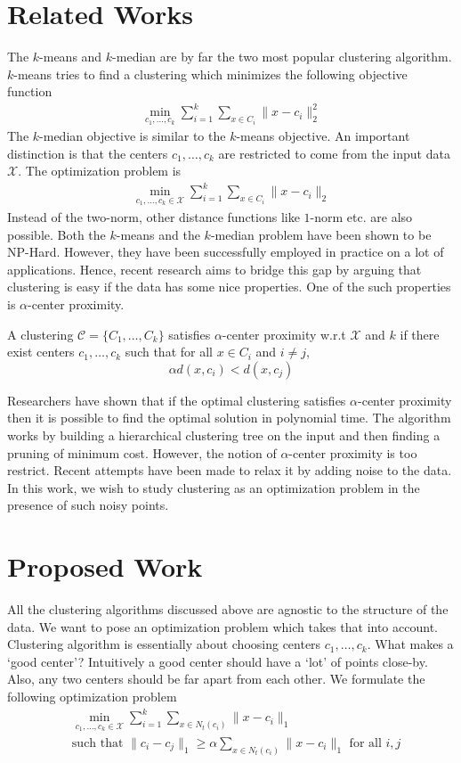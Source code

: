 \documentclass{article}
\newcommand{\mc}{\mathcal}
\begin{document}
\section{Related Works}
The $k$-means and $k$-median are by far the two most popular clustering algorithm. $k$-means tries to find a clustering which minimizes the following objective function
\begin{align*}
	\min_{c_1, \ldots, c_k} \sum_{i=1}^k \sum_{x \in C_i} \|x-c_i\|_2^2 
\end{align*}
The $k$-median objective is similar to the $k$-means objective. An important distinction is that the centers $c_1, \ldots, c_k$ are restricted to come from the input data $\mc X$. The optimization problem is
\begin{align*}
	\min_{c_1, \ldots, c_k \in \mc X} \sum_{i=1}^k \sum_{x \in C_i} \|x-c_i\|_2 
\end{align*}
Instead of the two-norm, other distance functions like $1$-norm etc. are also possible. Both the $k$-means and the $k$-median problem have been shown to be NP-Hard. However, they have been successfully employed in practice on a lot of applications. Hence, recent research aims to bridge this gap by arguing that clustering is easy if the data has some nice properties. One of the such properties is $\alpha$-center proximity. 

A clustering $\mc C = \{C_1, \ldots, C_k\}$ satisfies $\alpha$-center proximity w.r.t $\mc X$ and $k$ if there exist centers $c_1, \ldots, c_k$  such that for all $x \in C_i$ and $i\neq j$, $$\alpha d(x, c_i) < d(x, c_j)$$

Researchers have shown that if the optimal clustering satisfies $\alpha$-center proximity then it is possible to find the optimal solution in polynomial time. The algorithm works by building a hierarchical clustering tree on the input and then finding a pruning of minimum cost. However, the notion of $\alpha$-center proximity is too restrict. Recent attempts have been made to relax it by adding noise to the data. In this work, we wish to study clustering as an optimization problem in the presence of such noisy points.  

\section{Proposed Work}
All the clustering algorithms discussed above are agnostic to the structure of the data. We want to pose an optimization problem which takes that into account. Clustering algorithm is essentially about choosing centers $c_1, \ldots, c_k$. What makes a `good center'? Intuitively a good center should have a `lot' of points close-by. Also, any two centers should be far apart from each other. We formulate the following optimization problem
\begin{align*}
	&\min_{c_1, \ldots, c_k \in \mc X} \sum_{i=1}^k \sum_{x \in N_t(c_i)} \|x-c_i\|_1 \\
	& \text{such that } \|c_i - c_j\|_1 \ge \alpha  \sum_{x \in N_t(c_i)} \|x-c_i\|_1 \text{ for all }i, j
\end{align*}
\end{document}
